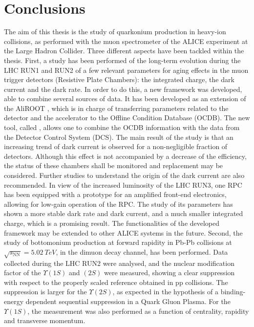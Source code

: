 \chapter{Conclusions}
The aim of this thesis is the study of quarkonium production in heavy-ion collisions, as performed with the muon spectrometer of the ALICE experiment at  the Large Hadron Collider. 
Three different aspects have been tackled within the thesis.
First, a study has been performed of the long-term evolution during the LHC RUN1 and RUN2 of a few relevant parameters for aging effects in the muon trigger detectors (Resistive Plate Chambers): the integrated charge, the dark current and the dark rate. 
In order to do this, a new framework was developed, able to combine several sources of data. It has been developed as an extension of the AliROOT , which is in charge of transferring parameters related to the detector and the accelerator to the Offline Condition Database (OCDB). 
The new tool, called , allows one to combine the OCDB information with the data from the Detector Control System (DCS). 
The main result of the study is that an increasing trend of dark current is observed for a non-negligible fraction of detectors.
Although this effect is not accompanied by a decrease of the efficiency, the status of these chambers shall be monitored and replacement may be considered.
Further studies to understand the origin of the dark current are also recommended.
In view of the increased luminosity of the LHC RUN3, one RPC has been equipped with a prototype for an amplified front-end electronics, allowing for low-gain operation of the RPC. 
The study of its parameters has shown a more stable dark rate and dark current, and a much smaller integrated charge, which is a promising result. 
The functionalities of the developed framework may be extended to other ALICE systems in the future.
Second, the study of bottomonium production at forward rapidity in Pb-Pb collisions at $\sqrt{s_{\mathrm{NN}}}=5.02\ TeV$, in the dimuon decay channel, has been performed.
Data collected during the LHC RUN2 were analysed, and the nuclear modification factor of the $\Upsilon(1S)$ and $(2S)$ were measured, showing a clear suppression with respect to the properly scaled reference obtained in pp collisions. 
The suppression is larger for the $\Upsilon(2S)$, as expected in the hypothesis of a binding-energy dependent sequential suppression in a Quark Gluon Plasma. 
For the $\Upsilon(1S)$, the measurement was also performed as a function of centrality, rapidity and transverse momentum. 
